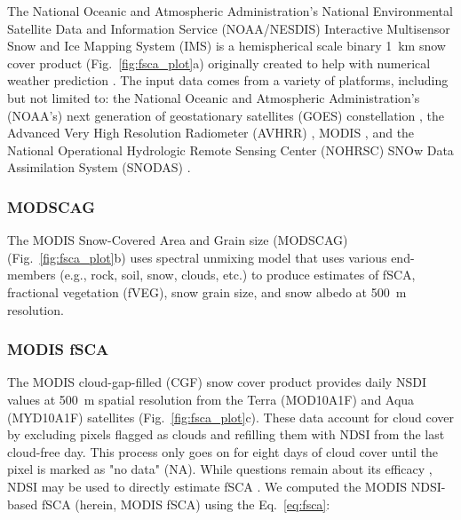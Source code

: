 The National Oceanic and Atmospheric Administration’s National Environmental Satellite Data and Information Service (NOAA/NESDIS) Interactive Multisensor Snow and Ice Mapping System (IMS) is a hemispherical scale binary 1~km snow cover product (Fig.~\ref{fig:fsca_plot}a) originally created to help with numerical weather prediction 
\citep{ramsayInteractiveMultisensorSnow1998, helfrichEnhancementsForthcomingDevelopments2007}. The input data comes from a variety of platforms, including but not limited to: the National Oceanic and Atmospheric Administration's (NOAA's) next generation of geostationary satellites (GOES) constellation \citep{menzelIntroducingGOESIFirst1994}, the Advanced Very High Resolution Radiometer (AVHRR) \citep{cracknellAdvancedVeryHigh1997}, MODIS \citep{salomonsonMODISAdvancedFacility1989}, and the National Operational Hydrologic Remote Sensing Center (NOHRSC) SNOw Data Assimilation System (SNODAS) \citep{barrettandrewNationalOperationalHydrologic2003}.

\hypertarget{ch4-methods-4}{\subsubsection{MODSCAG}\label{ch4-methods-4}}

The MODIS Snow-Covered Area and Grain size (MODSCAG) (Fig.~\ref{fig:fsca_plot}b) \citep{painterRetrievalSubpixelSnow2009} uses spectral unmixing model that uses various end-members (e.g., rock, soil, snow, clouds, etc.) to produce estimates of fSCA, fractional vegetation (fVEG), snow grain size, and snow albedo at 500~m resolution.

\hypertarget{ch4-methods-5}{\subsubsection{MODIS fSCA}\label{ch4-methods-5}}

The MODIS cloud-gap-filled (CGF) snow cover product \citep{hallEvaluationMODISVIIRS2019} provides daily NSDI values at 500~m spatial resolution from the Terra (MOD10A1F) and Aqua (MYD10A1F) satellites (Fig.~\ref{fig:fsca_plot}c). These data account for cloud cover by excluding pixels flagged as clouds and refilling them with NDSI from the last cloud-free day. This process only goes on for eight days of cloud cover until the pixel is marked as "no data" (NA). While questions remain about its efficacy \citep{nolinRecentAdvancesRemote2010, rittgerAssessmentMethodsMapping2013}, NDSI may be used to directly estimate fSCA \citep{salomonsonEstimatingFractionalSnow2004, salomonsonDevelopmentAquaMODIS2006,stillingerLandsatMODISVIIRS2023}. We computed the MODIS NDSI-based fSCA (herein, MODIS fSCA) using the Eq.~\ref{eq:fsca}:

